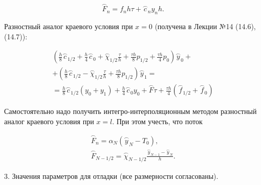 \documentclass[a4paper,14pt]{article}
\begin{document}
\begin{equation}
	\stackrel{\frown}{F}_n = f_n h \tau + \stackrel{\frown}{c}_n y_n h.
\end{equation}

Разностный аналог краевого условия при $x = 0$ (получена в Лекции №14 (14.6),(14.7)):

\begin{eqnarray}
	\left( \frac{h}{8} \stackrel{\frown}{c}_{1/2} + \frac{h}{4} \stackrel{\frown}{c}_0 + \stackrel{\frown}{\chi}_{1/2} \frac{\tau}{h} + \frac{\tau h}{8} p_{1/2} + \frac{\tau h}{4} p_0 \right) \stackrel{\frown}{y}_0 + \nonumber \\ 
	+ \left( \frac{h}{8} \stackrel{\frown}{c}_{1/2} - \stackrel{\frown}{\chi}_{1/2} \frac{\tau}{h} + \frac{\tau h}{8} p_{1/2} \right) \stackrel{\frown}{y}_1 = \nonumber \\
	= \frac{h}{8} \stackrel{\frown}{c}_{1/2} (y_0 + y_1) + \frac{h}{4} \stackrel{\frown}{c}_0 y_0 + \stackrel{\frown}{F} \tau + \frac{\tau h}{4} (\stackrel{\frown}{f}_{1/2} + \stackrel{\frown}{f}_0)
\end{eqnarray}

Самостоятельно надо получить интегро-интерполяционным методом разностный аналог краевого условия при $x = l$.
При этом учесть, что поток

\begin{eqnarray}
	\stackrel{\frown}{F}_n = \alpha_N (\stackrel{\frown}{y}_N - T_0), \\
	\stackrel{\frown}{F}_{N - 1/2} = \stackrel{\frown}{\chi}_{N-1/2} \frac{\stackrel{\frown}{y}_{N-1} - \stackrel{\frown}{y}_N }{h}.
\end{eqnarray}

3. Значения параметров для отладки (все размерности согласованы).
\end{document}
